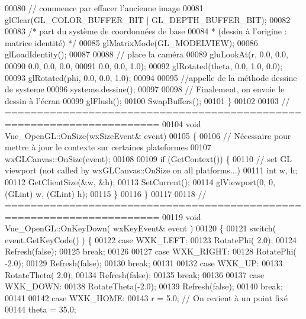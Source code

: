 \begin{DoxyCode}
00080   \textcolor{comment}{// commence par effacer l'ancienne image}
00081   glClear(GL\_COLOR\_BUFFER\_BIT | GL\_DEPTH\_BUFFER\_BIT);
00082 
00083   \textcolor{comment}{/* part du système de coordonnées de base }
00084 \textcolor{comment}{   * (dessin à l'origine : matrice identité) */}
00085   glMatrixMode(GL\_MODELVIEW);
00086   glLoadIdentity();
00087 
00088   \textcolor{comment}{// place la caméra}
00089   gluLookAt(r,   0.0, 0.0,
00090             0.0, 0.0, 0.0,
00091             0.0, 0.0, 1.0);
00092   glRotated(theta, 0.0, 1.0, 0.0); 
00093   glRotated(phi,   0.0, 0.0, 1.0);
00094     
00095     \textcolor{comment}{//appelle de la méthode dessine de systeme }
00096     systeme.dessine();
00097 
00098   \textcolor{comment}{// Finalement, on envoie le dessin à l'écran}
00099   glFlush();
00100   SwapBuffers();
00101 \}
00102 
00103 \textcolor{comment}{// ======================================================================}
00104 \textcolor{keywordtype}{void} Vue_OpenGL::OnSize(wxSizeEvent& event)
00105 \{
00106   \textcolor{comment}{// Nécessaire pour mettre à jour le contexte sur certaines plateformes}
00107   wxGLCanvas::OnSize(event);
00108 
00109   \textcolor{keywordflow}{if} (GetContext()) \{
00110     \textcolor{comment}{// set GL viewport (not called by wxGLCanvas::OnSize on all platforms...)}
00111     \textcolor{keywordtype}{int} w, h;
00112     GetClientSize(&w, &h);
00113     SetCurrent();
00114     glViewport(0, 0, (GLint) w, (GLint) h);
00115   \} 
00116 \}
00117 
00118 \textcolor{comment}{// ======================================================================}
00119 \textcolor{keywordtype}{void} Vue_OpenGL::OnKeyDown( wxKeyEvent& event )
00120 \{
00121   \textcolor{keywordflow}{switch}( event.GetKeyCode() ) \{
00122   \textcolor{keywordflow}{case} WXK\_LEFT: 
00123     RotatePhi( 2.0);
00124     Refresh(\textcolor{keyword}{false});
00125     \textcolor{keywordflow}{break};
00126 
00127   \textcolor{keywordflow}{case} WXK\_RIGHT: 
00128     RotatePhi( -2.0);
00129     Refresh(\textcolor{keyword}{false});
00130     \textcolor{keywordflow}{break};
00131 
00132   \textcolor{keywordflow}{case} WXK\_UP: 
00133     RotateTheta( 2.0);
00134     Refresh(\textcolor{keyword}{false});
00135     \textcolor{keywordflow}{break};
00136 
00137   \textcolor{keywordflow}{case} WXK\_DOWN: 
00138     RotateTheta(-2.0);
00139     Refresh(\textcolor{keyword}{false});
00140     \textcolor{keywordflow}{break};
00141 
00142   \textcolor{keywordflow}{case} WXK\_HOME:
00143     r     =  5.0;   \textcolor{comment}{// On revient à un point fixé}
00144     theta = 35.0;

\end{DoxyCode}
